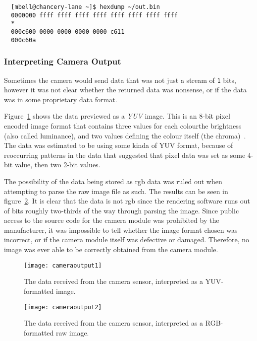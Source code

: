 \begin{verbatim}
  [mbell@chancery-lane ~]$ hexdump ~/out.bin
  0000000 ffff ffff ffff ffff ffff ffff ffff ffff
  *
  000c600 0000 0000 0000 0000 c611               
  000c60a
\end{verbatim}

\subsubsection{Interpreting Camera Output}
Sometimes the camera would send data that was not just a stream of \texttt{1}
bits, however it was not clear whether the returned data was nonsense, or if
the data was in some proprietary data format.

Figure~\ref{fig:yuvimage} shows the data previewed as a \textit{YUV} image.
This is an 8-bit pixel encoded image format that contains three values for
each colour\textemdash{}the brightness (also called luminance), and two
values defining the colour itself (the chroma)~\cite{softpixelyuv}. The data
was estimated to be using some kinda of YUV format, because of reoccurring
patterns in the data that suggested that pixel data was set as some 4-bit
value, then two 2-bit values.

The possibility of the data being stored as \acrfull{rgb} data was ruled out
when attempting to parse the raw image file as such. The results can be seen
in figure~\ref{fig:rgbimage}. It is clear that the data is not \acrshort{rgb}
since the rendering software runs out of bits roughly two-thirds of the way
through parsing the image. Since public access to the source code for the
camera module was prohibited by the manufacturer, it was impossible to tell
whether the image format chosen was incorrect, or if the camera module itself
was defective or damaged. Therefore, no image was ever able to be correctly
obtained from the camera module.

\begin{figure}[h]
  \centering
  \texttt{[image: cameraoutput1]}
  \caption{The data received from the camera sensor, interpreted as a
  YUV-formatted image.}
  \label{fig:yuvimage}
\end{figure}

\begin{figure}[h]
  \centering
  \texttt{[image: cameraoutput2]}
  \caption{The data received from the camera sensor, interpreted as a
  RGB-formatted raw image.}
  \label{fig:rgbimage}
\end{figure}

